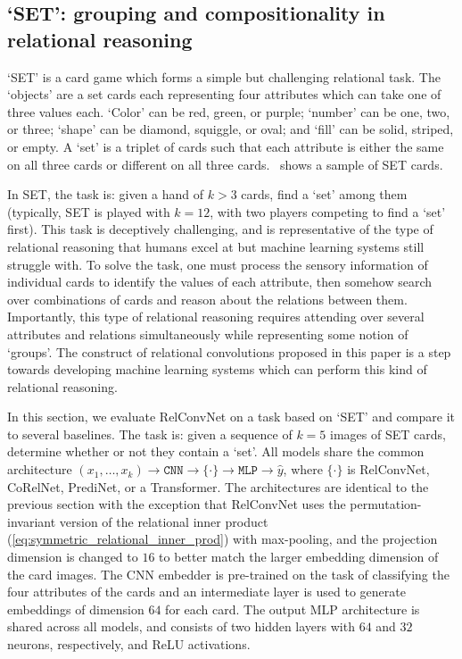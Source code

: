 \subsection{`SET': grouping and compositionality in relational reasoning}\label{ssec:experiments_set}

`SET' is a card game which forms a simple but challenging relational task. The `objects' are a set cards each representing four attributes which can take one of three values each. `Color' can be red, green, or purple; `number' can be one, two, or three; `shape' can be diamond, squiggle, or oval; and `fill' can be solid, striped, or empty. A `set' is a triplet of cards such that each attribute is either the same on all three cards or different on all three cards.~ shows a sample of SET cards.

In SET, the task is: given a hand of $k > 3$ cards, find a `set' among them (typically, SET is played with $k=12$, with two players competing to find a `set' first). This task is deceptively challenging, and is representative of the type of relational reasoning that humans excel at but machine learning systems still struggle with. To solve the task, one must process the sensory information of individual cards to identify the values of each attribute, then somehow search over combinations of cards and reason about the relations between them. Importantly, this type of relational reasoning requires attending over several attributes and relations simultaneously while representing some notion of `groups'.  The construct of relational convolutions proposed in this paper is a step towards developing machine learning systems which can perform this kind of relational reasoning.


In this section, we evaluate RelConvNet on a task based on `SET' and compare it to several baselines. The task is: given a sequence of $k=5$ images of SET cards, determine whether or not they contain a `set'. All models share the common architecture $(x_1, \ldots, x_k) \to \texttt{CNN} \to \{ \cdot \} \to \texttt{MLP} \to \hat{y}$, where $\{\cdot\}$ is RelConvNet, CoRelNet, PrediNet, or a Transformer. The architectures are identical to the previous section with the exception that RelConvNet uses the permutation-invariant version of the relational inner product (\cref{eq:symmetric_relational_inner_prod}) with max-pooling, and the projection dimension is changed to $16$ to better match the larger embedding dimension of the card images. The CNN embedder is pre-trained on the task of classifying the four attributes of the cards and an intermediate layer is used to generate embeddings of dimension $64$ for each card. The output MLP architecture is shared across all models, and consists of two hidden layers with $64$ and $32$ neurons, respectively, and ReLU activations.

